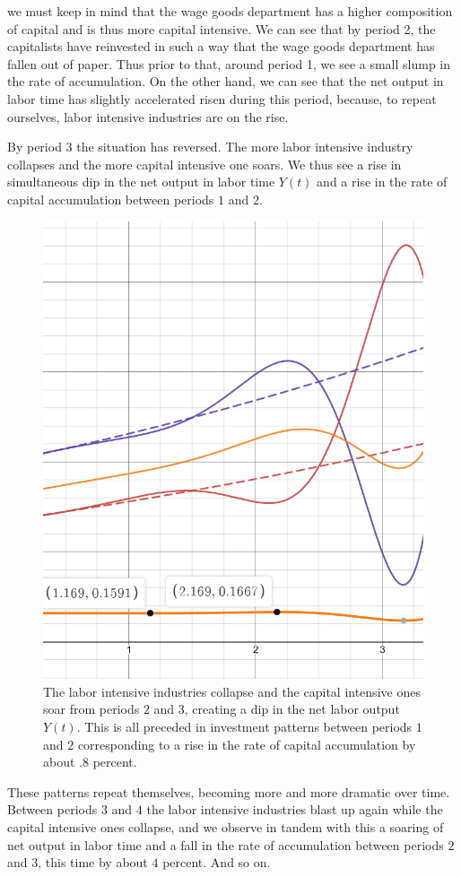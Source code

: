 \documentclass{article}
\theoremstyle{theorem}
\begin{document}
we must keep in mind that the wage goods department has a higher composition of capital and is thus more capital intensive. We can see that by period 2, the capitalists have reinvested in such a way that the wage goods department has fallen out of paper. Thus prior to that, around period 1, we see a small slump in the rate of accumulation. On the other hand, we can see that the net output in labor time has slightly accelerated risen during this period, because, to repeat ourselves, labor intensive industries are on the rise. \par 
By period $3$ the situation has reversed. The more labor intensive industry collapses and the more capital intensive one soars. We thus see a rise in simultaneous dip in the net output in labor time $Y(t)$ and a rise in the rate of capital accumulation between periods $1$ and $2$. 
\begin{figure}[H]
\centering
\includegraphics[scale=.7]{Images/slightRiseInAccumulation}
\caption{The labor intensive industries collapse and the capital intensive ones soar from periods $2$ and $3$, creating a dip in the net labor output $Y(t)$. This is all preceded in investment patterns between periods $1$ and $2$ corresponding to a rise in the rate of capital accumulation by about $.8$ percent.}
\end{figure}
These patterns repeat themselves, becoming more and more dramatic over time. Between periods $3$ and $4$ the labor intensive industries blast up again while the capital intensive ones collapse, and we observe in tandem with this a soaring of net output in labor time and a fall in the rate of accumulation between periods $2$ and $3$, this time by about $4$ percent. And so on. \par 
\end{document}
